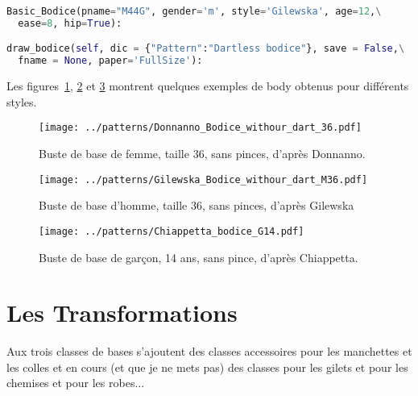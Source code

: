 \documentclass[10pt,a4paper,twoside]{report}
\begin{document}
\begin{lstlisting}[language=python]
Basic_Bodice(pname="M44G", gender='m', style='Gilewska', age=12,\
  ease=8, hip=True):

draw_bodice(self, dic = {"Pattern":"Dartless bodice"}, save = False,\
  fname = None, paper='FullSize'):

\end{lstlisting}

Les figures~\ref{fig:bodice_DW36}, \ref{fig:bodice_MG36} et \ref{fig:CB14} montrent quelques exemples de body obtenus pour différents styles.


\begin{figure}[hbtp]
\centering
\texttt{[image: ../patterns/Donnanno\_Bodice\_withour\_dart\_36.pdf]}
\caption{Buste de base de femme, taille 36, sans pinces, d'après Donnanno.}
\label{fig:bodice_DW36}
\end{figure}

\begin{figure}[hbtp]
\centering
\texttt{[image: ../patterns/Gilewska\_Bodice\_withour\_dart\_M36.pdf]}
\caption{Buste de base d'homme, taille 36, sans pinces, d'après Gilewska}
\label{fig:bodice_MG36}
\end{figure}

\begin{figure}[hbtp]
\centering
\texttt{[image: ../patterns/Chiappetta\_bodice\_G14.pdf]}
\caption{Buste de base de garçon, 14 ans, sans pince, d'après Chiappetta.}
\label{fig:CB14}
\end{figure}



\section{Les Transformations}


Aux trois classes de bases s'ajoutent des classes accessoires pour les manchettes et les colles
et en cours (et que je ne mets pas) des classes pour les gilets et pour les chemises et pour les robes...
\end{document}
